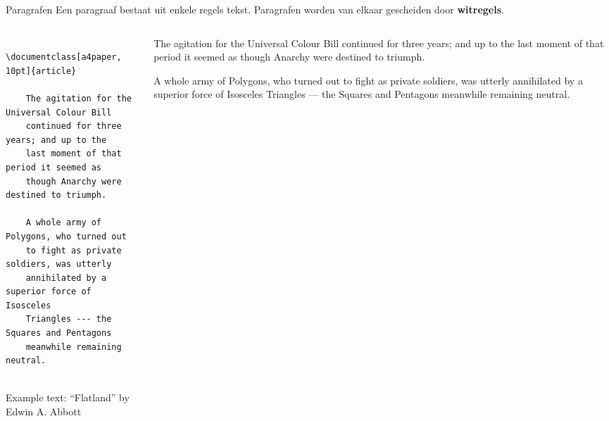 \copyrightTim

\begin{frame}[fragile, t]{Paragrafen}
	Een paragraaf bestaat uit enkele regels tekst. Paragrafen worden van elkaar gescheiden door \textbf{witregels}.\newline
	\begin{columns}[t]
        \begin{column}{0.5\textwidth}
	\begin{verbatim} 
	\documentclass[a4paper, 10pt]{article}
	
	The agitation for the Universal Colour Bill 
	continued for three years; and up to the 
	last moment of that period it seemed as 
	though Anarchy were destined to triumph.

	A whole army of Polygons, who turned out 
	to fight as private soldiers, was utterly 
	annihilated by a superior force of Isosceles 
	Triangles --- the Squares and Pentagons 
	meanwhile remaining neutral.
	
	\end{verbatim}
	{\tiny
	Example text: ``Flatland''
	by Edwin A. Abbott
	}\par
	\end{column}
	\begin{column}{0.5\textwidth}
	\vspace{0pt}
	\begin{tcolorbox}\small \setlength\parindent{20pt}
	The agitation for the Universal Colour Bill continued for three years; 
	and up to the last moment of that period it seemed as though Anarchy 
	were destined to triumph.

	A whole army of Polygons, who turned out to fight as private soldiers, 
	was utterly annihilated by a superior force of Isosceles 
	Triangles --- the Squares and Pentagons meanwhile remaining neutral.
	\end{tcolorbox}
\end{column}
\end{columns}

\end{frame}